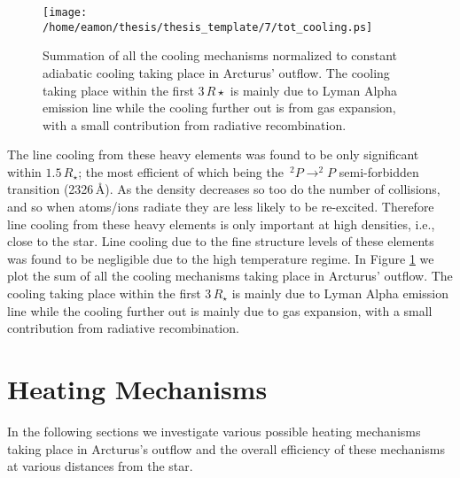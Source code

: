 \begin{figure}[!ht]
\centering 
         \texttt{[image: /home/eamon/thesis/thesis\_template/7/tot\_cooling.ps]}
\caption[Summation of all cooling mechanisms]{Summation of all the cooling mechanisms normalized to constant adiabatic cooling taking place in Arcturus' outflow. The cooling taking place within the first $3\,R\star$ is mainly due to Lyman Alpha emission line while the cooling further out is from gas expansion, with a small contribution from radiative recombination.}
\label{fig:7.2}
\end{figure}

The line cooling from these heavy elements was found to be only significant within $1.5\,R_{\star}$; the most efficient of which being the \,$^{2}P \rightarrow ^{2}P$ semi-forbidden transition (2326\,\AA). As the density decreases so too do the number of collisions, and so when atoms/ions radiate they are less likely to be re-excited. Therefore line cooling from these heavy elements is only important at high densities, i.e., close to the star. Line cooling due to the fine structure levels of these elements was found to be negligible due to the high temperature regime. In Figure \ref{fig:7.2} we plot the sum of all the cooling mechanisms taking place in Arcturus' outflow. The cooling taking place within the first $3\,R_{\star}$ is mainly due to Lyman Alpha emission line while the cooling further out is mainly due to gas expansion, with a small contribution from radiative recombination. 

\section{Heating Mechanisms}\label{sec:7.4}
In the following sections we investigate various possible heating mechanisms taking place in Arcturus's outflow and the  overall efficiency of these mechanisms at various distances from the star. 

